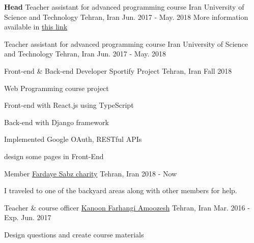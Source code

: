 

\begin{cventries}

  \cventry
  {\textbf{Head} Teacher assistant for advanced programming course} %
  {Iran University of Science and Technology} %
  {Tehran, Iran} %
  {Jun. 2017 - May. 2018} %
  {More information available in \textcolor{blue}{\href{https://sauleh.github.io/ap97/}{this link}}}

  \cventry
  {Teacher assistant for advanced programming course} %
  {Iran University of Science and Technology} %
  {Tehran, Iran} %
  {Jun. 2017 - May. 2018} %
  {}

  \cventry
  {Front-end \& Back-end Developer} %
  {Sportify Project} %
  {Tehran, Iran} %
  {Fall 2018} %
  {
    \begin{cvitems} %
      \item {Web Programming course project}
      \item {Front-end with React.js using TypeScript}
      \item {Back-end with Django framework}
      \item {Implemented Google OAuth, RESTful APIs}
      \item {design some pages in Front-End}
    \end{cvitems}
  }
  
  \cventry
  {Member} %
  {\href{fardayesabz.sharif.ir}{Fardaye Sabz charity}} %
  {Tehran, Iran} %
  {2018 - Now} %
  {
    \begin{cvitems} %
      \item {I traveled to one of the backyard areas along with other members for help.}
    \end{cvitems}
  }

  \cventry
  {Teacher \& course officer} %
  {\href{http://www.kanoon.ir/}{Kanoon Farhangi Amoozesh}} %
  {Tehran, Iran} %
  {Mar. 2016 - Exp. Jun. 2017} %
  {
    \begin{cvitems} %
      \item {Design questions and create course materials}
    \end{cvitems}
  }


\end{cventries}
